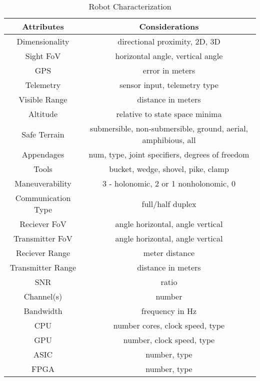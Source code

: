 \begin{table}[H]
\caption{Robot Characterization}
\begin{center}
\begin{tabular}{|c|c|}
\hline
\textbf{Attributes}&{\textbf{Considerations}} \\
\cline{2-4}
\hline
Dimensionality & directional proximity, 2D, 3D \\
Sight FoV & horizontal angle, vertical angle \\
\hline
GPS & error in meters\\
Telemetry & sensor input, telemetry type\\
Visible Range & distance in meters\\
\hline
Altitude & relative to state space minima\\
Safe Terrain & submersible, non-submersible, ground, aerial, amphibious, all\\
\hline
Appendages& num, type, joint specifiers, degrees of freedom\\
Tools& bucket, wedge, shovel, pike, clamp\\
Maneuverability& 3 - holonomic, 2 or 1 nonholonomic, 0\\
\hline
Communication Type & full/half duplex\\
Reciever FoV & angle horizontal, angle vertical\\
Transmitter FoV & angle horizontal, angle vertical\\
Reciever Range & meter distance\\
Transmitter Range & distance in meters\\
SNR & ratio\\
Channel(s) & number\\
Bandwidth & frequency in Hz\\
\hline
CPU & number cores, clock speed, type\\
GPU & number, clock speed, type\\
ASIC & number, type\\
FPGA & number, type\\
\hline
\end{tabular}
\label{tabl:attributes}
\end{center}
\end{table}


